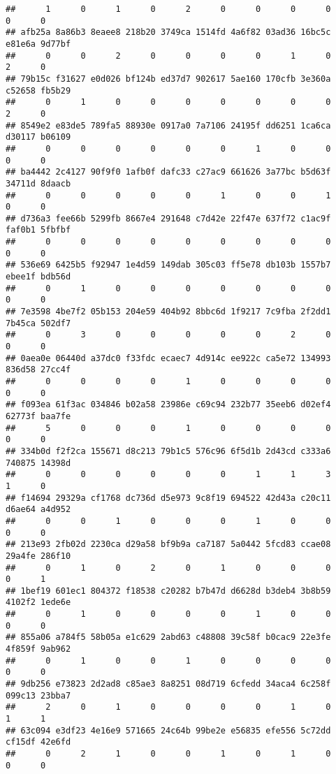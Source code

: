 \documentclass[
]{article}
\begin{document}
\begin{verbatim}
##      1      0      1      0      2      0      0      0      0      0      0 
## afb25a 8a86b3 8eaee8 218b20 3749ca 1514fd 4a6f82 03ad36 16bc5c e81e6a 9d77bf 
##      0      0      2      0      0      0      0      1      0      2      0 
## 79b15c f31627 e0d026 bf124b ed37d7 902617 5ae160 170cfb 3e360a c52658 fb5b29 
##      0      1      0      0      0      0      0      0      0      2      0 
## 8549e2 e83de5 789fa5 88930e 0917a0 7a7106 24195f dd6251 1ca6ca d30117 b06109 
##      0      0      0      0      0      0      1      0      0      0      0 
## ba4442 2c4127 90f9f0 1afb0f dafc33 c27ac9 661626 3a77bc b5d63f 34711d 8daacb 
##      0      0      0      0      0      1      0      0      1      0      0 
## d736a3 fee66b 5299fb 8667e4 291648 c7d42e 22f47e 637f72 c1ac9f faf0b1 5fbfbf 
##      0      0      0      0      0      0      0      0      0      0      0 
## 536e69 6425b5 f92947 1e4d59 149dab 305c03 ff5e78 db103b 1557b7 ebee1f bdb56d 
##      0      1      0      0      0      0      0      0      0      0      0 
## 7e3598 4be7f2 05b153 204e59 404b92 8bbc6d 1f9217 7c9fba 2f2dd1 7b45ca 502df7 
##      0      3      0      0      0      0      0      2      0      0      0 
## 0aea0e 06440d a37dc0 f33fdc ecaec7 4d914c ee922c ca5e72 134993 836d58 27cc4f 
##      0      0      0      0      1      0      0      0      0      0      0 
## f093ea 61f3ac 034846 b02a58 23986e c69c94 232b77 35eeb6 d02ef4 62773f baa7fe 
##      5      0      0      0      1      0      0      0      0      0      0 
## 334b0d f2f2ca 155671 d8c213 79b1c5 576c96 6f5d1b 2d43cd c333a6 740875 14398d 
##      0      0      0      0      0      0      1      1      3      1      0 
## f14694 29329a cf1768 dc736d d5e973 9c8f19 694522 42d43a c20c11 d6ae64 a4d952 
##      0      0      1      0      0      0      1      0      0      0      0 
## 213e93 2fb02d 2230ca d29a58 bf9b9a ca7187 5a0442 5fcd83 ccae08 29a4fe 286f10 
##      0      1      0      2      0      1      0      0      0      0      1 
## 1bef19 601ec1 804372 f18538 c20282 b7b47d d6628d b3deb4 3b8b59 4102f2 1ede6e 
##      0      1      0      0      0      0      1      0      0      0      0 
## 855a06 a784f5 58b05a e1c629 2abd63 c48808 39c58f b0cac9 22e3fe 4f859f 9ab962 
##      0      1      0      0      1      0      0      0      0      0      0 
## 9db256 e73823 2d2ad8 c85ae3 8a8251 08d719 6cfedd 34aca4 6c258f 099c13 23bba7 
##      2      0      1      0      0      0      0      1      0      1      1 
## 63c094 e3df23 4e16e9 571665 24c64b 99be2e e56835 efe556 5c72dd cf15df 42e6fd 
##      0      2      1      0      0      1      0      1      0      0      0 

\end{verbatim}
\end{document}
